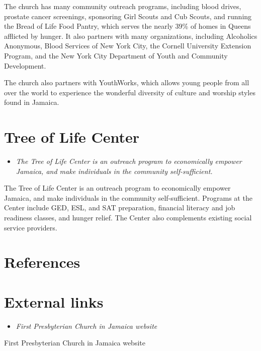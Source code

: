 The church has many community outreach programs, including blood drives,
prostate cancer screenings, sponsoring Girl Scouts and Cub Scouts, and
running the Bread of Life Food Pantry, which serves the nearly 39\% of
homes in Queens afflicted by hunger. It also partners with many
organizations, including Alcoholics Anonymous, Blood Services of New
York City, the Cornell University Extension Program, and the New York
City Department of Youth and Community Development.

The church also partners with YouthWorks, which allows young people from
all over the world to experience the wonderful diversity of culture and
worship styles found in Jamaica.

\section{Tree of Life Center}\label{tree-of-life-center}

\begin{itemize}
\item
  \emph{The Tree of Life Center is an outreach program to economically
  empower Jamaica, and make individuals in the community
  self-sufficient.}
\end{itemize}

The Tree of Life Center is an outreach program to economically empower
Jamaica, and make individuals in the community self-sufficient. Programs
at the Center include GED, ESL, and SAT preparation, financial literacy
and job readiness classes, and hunger relief. The Center also
complements existing social service providers.

\section{References}\label{references}

\section{External links}\label{external-links}

\begin{itemize}
\item
  \emph{First Presbyterian Church in Jamaica website}
\end{itemize}

First Presbyterian Church in Jamaica website
